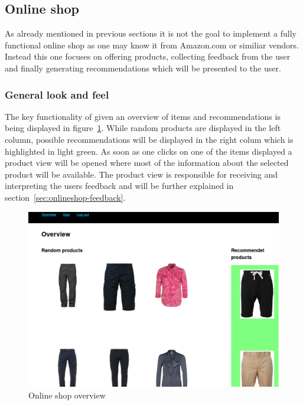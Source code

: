 
\subsection{Online shop}
As already mentioned in previous sections it is not the goal to implement a fully functional online shop as one may know it from Amazon.com or similiar vendors.
Instead this one focuses on offering products, collecting feedback from the user and finally generating recommendations which will be presented to the user.

\subsubsection{General look and feel}
The key functionality of given an overview of items and recommendations is being displayed in figure~\ref{fig:onlineshop-overview}.
While random products are displayed in the left column, possible recommendations will be displayed in the right colum which is highlighted in light green.
As soon as one clicks on one of the items displayed a product view will be opened where most of the information about the selected product will be available.
The product view is responsible for receiving and interpreting the users feedback and will be further explained in section~\ref{sec:onlineshop-feedback}.

\begin{figure}[h]
    \center
    \includegraphics[scale=0.3]{inc/implementation/onlineshop/recommender_onlineshop_overview}
    \caption{Online shop overview}
    \label{fig:onlineshop-overview}
\end{figure}

